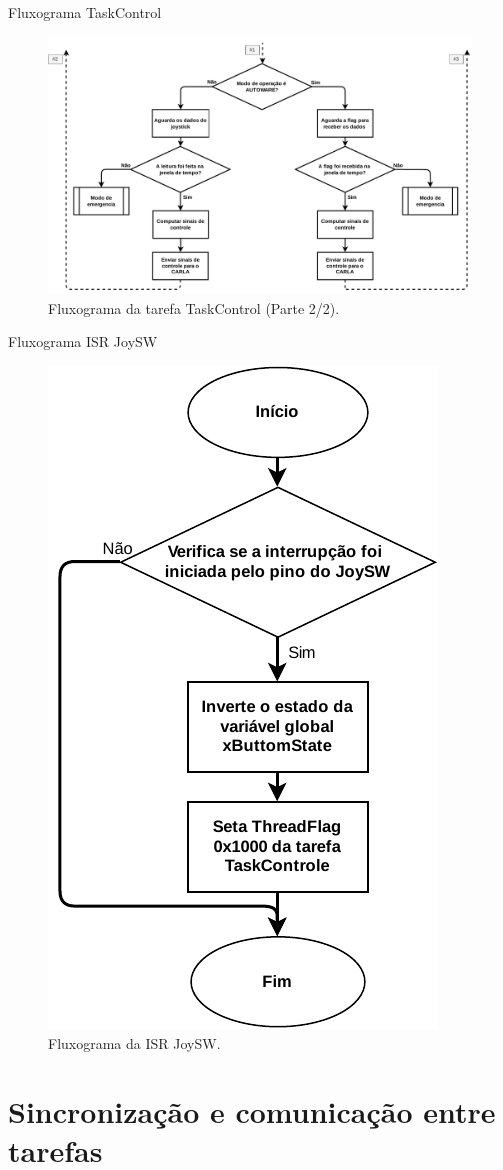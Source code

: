 \documentclass{if-beamer}
\begin{document}
\begin{frame}{Fluxograma TaskControl}



	\begin{figure}[H]
		\centering
		\includegraphics[width=0.8\linewidth]{img/fluxograma_taskcontrol_2}
		\caption{Fluxograma da tarefa TaskControl (Parte 2/2).}
		\label{fig:fluxograma_taskcontrol_2}
\end{figure}

\end{frame}


\begin{frame}{Fluxograma ISR JoySW}



\begin{figure}[H]
	\centering
	\includegraphics[width=0.29\linewidth]{img/fluxograma_joysw}
	\caption{Fluxograma da ISR JoySW.}
	\label{fig:fluxograma_joysw}
\end{figure}

\end{frame}



\section{Sincronização e comunicação entre tarefas}
\end{document}
